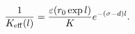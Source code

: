 \begin{equation}
\label{stiffness}
\frac{1}{K_{\rm eff}(l)}=\frac{\varepsilon(r_0\exp l)}{K}e^{-(\sigma-d)l}.
\end{equation}

